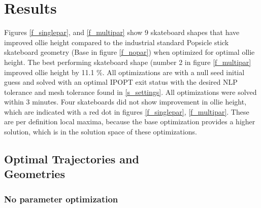 \documentclass[default,iicol]{sn-jnl}
\begin{document}
{\section{Results}
Figures \ref{f_singlepar}, and \ref{f_multipar} show 9 skateboard shapes that have improved ollie height compared to the industrial standard Popsicle stick skateboard geometry (Base in figure \ref{f_nopar}) when optimized for optimal ollie height. The best performing skateboard shape (number 2 in figure \ref{f_multipar} improved ollie height by 11.1 \%. All optimizations are with a null seed initial guess and solved with an optimal IPOPT exit status with the desired NLP tolerance and mesh tolerance found in \ref{s_settings}. All optimizations were solved within 3 minutes. Four skateboards did not show improvement in ollie height, which are indicated with a red dot in figures \ref{f_singlepar}, \ref{f_multipar}. These are per definition local maxima, because the base optimization provides a higher solution, which is in the solution space of these optimizations. 

\subsection{Optimal Trajectories and \\Geometries}
\subsubsection{No parameter optimization}

\begin{figure}[!t]
\captionsetup[subfigure]{}

       

\end{figure}}
\end{document}
